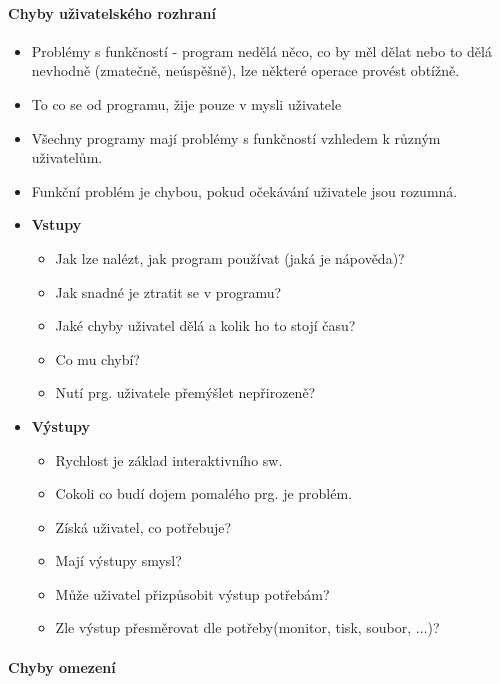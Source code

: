 \paragraph{Chyby uživatelského rozhraní}
\begin{itemize}[itemsep=0px]
\item Problémy s funkčností - program nedělá něco, co by měl dělat nebo to dělá nevhodně (zmatečně, neúspěšně), lze některé operace provést obtížně.
\item To co se  od programu, žije pouze v mysli uživatele
\item Všechny programy mají problémy s funkčností vzhledem k různým uživatelům.
\item Funkční problém je chybou, pokud očekávání uživatele jsou rozumná.
\item \textbf{Vstupy}

    \begin{itemize}[itemsep=0px]
    \item Jak lze nalézt, jak program používat (jaká je nápověda)?
    \item Jak snadné je ztratit se v programu?
    \item Jaké chyby uživatel dělá a kolik ho to stojí času?
    \item Co mu chybí?
    \item Nutí prg. uživatele přemýšlet nepřirozeně?
    \end{itemize}
    
\item \textbf{Výstupy}

    \begin{itemize}[itemsep=0px]
    \item Rychlost je základ interaktivního sw.
    \item Cokoli co budí dojem pomalého prg. je problém.
    \item Získá uživatel, co potřebuje?
    \item Mají výstupy smysl?
    \item Může uživatel přizpůsobit výstup potřebám?
    \item Zle výstup přesměrovat dle potřeby(monitor, tisk, soubor, $\hdots$)?
    \end{itemize}
\end{itemize}
\paragraph{Chyby omezení}

